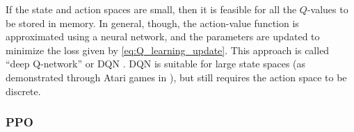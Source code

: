 If the state and action spaces are small, then it is feasible for all the $Q$-values to be stored in memory. In general, though, the action-value function is approximated using a neural network, and the parameters are updated to minimize the loss given by \ref{eq:Q_learning_update}. This approach is called ``deep Q-network'' or DQN \cite{mnih2013playing}. DQN is suitable for large state spaces (as demonstrated through Atari games in \cite{mnih2013playing}), but still requires the action space to be discrete.

%

\subsubsection{PPO}

